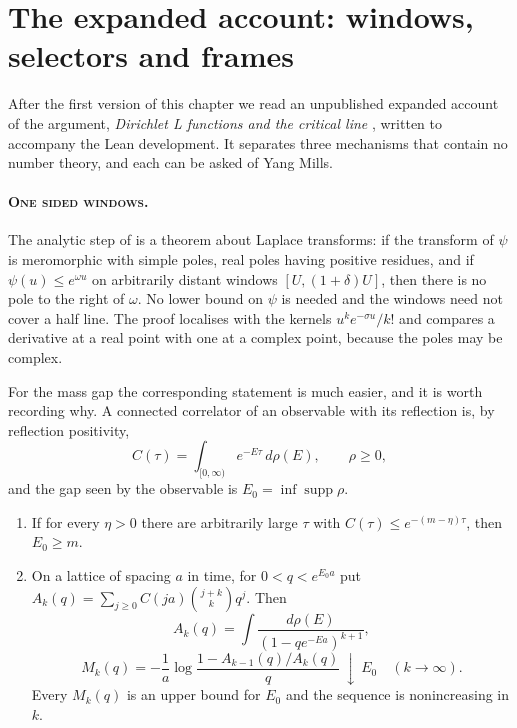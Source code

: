 \section{The expanded account: windows, selectors and frames}\label{sec:windows}

After the first version of this chapter we read an unpublished expanded account of the argument, \emph{Dirichlet L functions and the critical line} \cite{DLCL}, written to accompany the Lean development. It separates three mechanisms that contain no number theory, and each can be asked of Yang Mills.

\paragraph{\normalfont\scshape One sided windows.} The analytic step of \cite{DLCL} is a theorem about Laplace transforms: if the transform of $\psi$ is meromorphic with simple poles, real poles having positive residues, and if $\psi(u)\le e^{\omega u}$ on arbitrarily distant windows $[U,(1+\delta)U]$, then there is no pole to the right of $\omega$. No lower bound on $\psi$ is needed and the windows need not cover a half line. The proof localises with the kernels $u^ke^{-\sigma u}/k!$ and compares a derivative at a real point with one at a complex point, because the poles may be complex.

For the mass gap the corresponding statement is much easier, and it is worth recording why. A connected correlator of an observable with its reflection is, by reflection positivity,
\[
C(\tau)=\int_{[0,\infty)}e^{-E\tau}\,d\rho(E),\qquad\rho\ge0,
\]
and the gap seen by the observable is $E_0=\inf\operatorname{supp}\rho$.

\begin{proposition}\label{prop:windowgap}
\begin{enumerate}
\item[(i)] If for every $\eta>0$ there are arbitrarily large $\tau$ with $C(\tau)\le e^{-(m-\eta)\tau}$, then $E_0\ge m$.
\item[(ii)] On a lattice of spacing $a$ in time, for $0<q<e^{E_0a}$ put $A_k(q)=\sum_{j\ge0}C(ja)\binom{j+k}{k}q^j$. Then
\[
A_k(q)=\int\frac{d\rho(E)}{(1-qe^{-Ea})^{k+1}},
\]
\[
M_k(q)=-\frac1a\log\frac{1-A_{k-1}(q)/A_k(q)}{q}\ \downarrow\ E_0\quad(k\to\infty).
\]
Every $M_k(q)$ is an upper bound for $E_0$ and the sequence is nonincreasing in $k$.
\end{enumerate}
\end{proposition}


